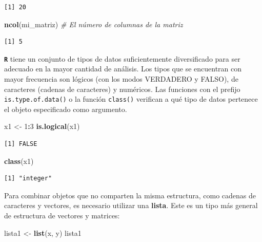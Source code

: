 \documentclass[
]{article}
\newenvironment{Shaded}{\begin{snugshade}}{\end{snugshade}}
\newcommand{\CommentTok}[1]{\textcolor[rgb]{0.56,0.35,0.01}{\textit{#1}}}
\newcommand{\DecValTok}[1]{\textcolor[rgb]{0.00,0.00,0.81}{#1}}
\newcommand{\FunctionTok}[1]{\textcolor[rgb]{0.13,0.29,0.53}{\textbf{#1}}}
\newcommand{\NormalTok}[1]{#1}
\newcommand{\OtherTok}[1]{\textcolor[rgb]{0.56,0.35,0.01}{#1}}
\newcommand{\SpecialCharTok}[1]{\textcolor[rgb]{0.81,0.36,0.00}{\textbf{#1}}}
\begin{document}
\begin{verbatim}
[1] 20
\end{verbatim}

\begin{Shaded}
\begin{Highlighting}[]
\FunctionTok{ncol}\NormalTok{(mi\_matriz)  }\CommentTok{\# El número de columnas de la matriz }
\end{Highlighting}
\end{Shaded}

\begin{verbatim}
[1] 5
\end{verbatim}

\textbf{\texttt{R}} tiene un conjunto de tipos de datos suficientemente diversificado para ser adecuado en la mayor cantidad de análisis. Los tipos que se encuentran con mayor frecuencia son lógicos (con los modos VERDADERO y FALSO), de caracteres (cadenas de caracteres) y numéricos. Las funciones con el prefijo \texttt{is.type.of.data()} o la función \texttt{class()} verifican a qué tipo de datos pertenece el objeto especificado como argumento.

\begin{Shaded}
\begin{Highlighting}[]
\NormalTok{x1 }\OtherTok{\textless{}{-}} \DecValTok{1}\SpecialCharTok{:}\DecValTok{3}
\FunctionTok{is.logical}\NormalTok{(x1)}
\end{Highlighting}
\end{Shaded}

\begin{verbatim}
[1] FALSE
\end{verbatim}

\begin{Shaded}
\begin{Highlighting}[]
\FunctionTok{class}\NormalTok{(x1)}
\end{Highlighting}
\end{Shaded}

\begin{verbatim}
[1] "integer"
\end{verbatim}

Para combinar objetos que no comparten la misma estructura, como cadenas de caracteres y vectores, es necesario utilizar una \textbf{lista}. Este es un tipo más general de estructura de vectores y matrices:

\begin{Shaded}
\begin{Highlighting}[]
\NormalTok{lista1 }\OtherTok{\textless{}{-}} \FunctionTok{list}\NormalTok{(x, y)}
\NormalTok{lista1}
\end{Highlighting}
\end{Shaded}
\end{document}
